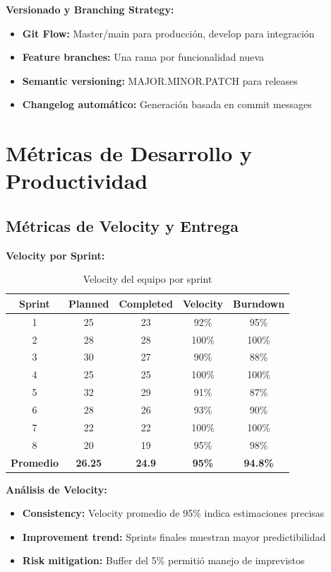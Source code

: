 \documentclass[12pt,a4paper]{report}
\begin{document}
\textbf{Versionado y Branching Strategy:}
\begin{itemize}
\item \textbf{Git Flow:} Master/main para producción, develop para integración
\item \textbf{Feature branches:} Una rama por funcionalidad nueva
\item \textbf{Semantic versioning:} MAJOR.MINOR.PATCH para releases
\item \textbf{Changelog automático:} Generación basada en commit messages
\end{itemize}

\section{Métricas de Desarrollo y Productividad}

\subsection{Métricas de Velocity y Entrega}

\textbf{Velocity por Sprint:}
\begin{table}[h]
\centering
\caption{Velocity del equipo por sprint}
\begin{tabular}{|c|c|c|c|c|}
\hline
\textbf{Sprint} & \textbf{Planned} & \textbf{Completed} & \textbf{Velocity} & \textbf{Burndown} \\
\hline
1 & 25 & 23 & 92\% & 95\% \\
\hline
2 & 28 & 28 & 100\% & 100\% \\
\hline
3 & 30 & 27 & 90\% & 88\% \\
\hline
4 & 25 & 25 & 100\% & 100\% \\
\hline
5 & 32 & 29 & 91\% & 87\% \\
\hline
6 & 28 & 26 & 93\% & 90\% \\
\hline
7 & 22 & 22 & 100\% & 100\% \\
\hline
8 & 20 & 19 & 95\% & 98\% \\
\hline
\textbf{Promedio} & \textbf{26.25} & \textbf{24.9} & \textbf{95\%} & \textbf{94.8\%} \\
\hline
\end{tabular}
\end{table}

\textbf{Análisis de Velocity:}
\begin{itemize}
\item \textbf{Consistency:} Velocity promedio de 95\% indica estimaciones precisas
\item \textbf{Improvement trend:} Sprints finales muestran mayor predictibilidad
\item \textbf{Risk mitigation:} Buffer del 5\% permitió manejo de imprevistos
\end{itemize}
\end{document}
